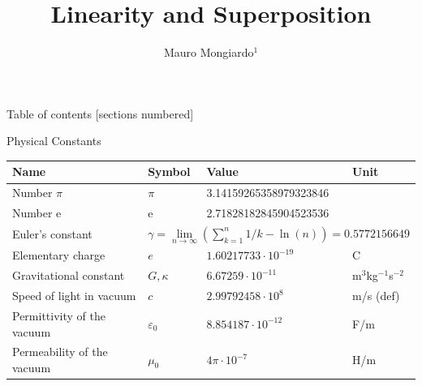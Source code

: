 \documentclass[10pt]{beamer}
\title{Linearity and Superposition}
\date{}
\author{ Mauro Mongiardo$^1$}
\institute{ $^1$ Department of Engineering, University of Perugia, Perugia, Italy.
}
\begin{document}
\maketitle

\begin{frame}{Table of contents}
  [sections numbered]
  \tableofcontents[hideallsubsections]
\end{frame}


\begin{frame}[shrink=40]{Physical Constants}


\begin{center}
\begin{tabular}{||l|lll||} 
\hline
{\bf Name}&{\bf Symbol}&{\bf Value}&{\bf Unit}\\
\hline
\hline
Number $\pi$                 &$\pi$&3.14159265358979323846&\\
Number e                     &e    &2.71828182845904523536&\\
Euler's constant &\multicolumn{3}{|l||}{$\gamma=\lim\limits_{n\rightarrow\infty}\left(\sum\limits_{k=1}^n 1/k-\ln(n)\right)=0.5772156649$}\\
\hline
Elementary charge            &$e$&$1.60217733\cdot10^{-19}$&C\rule{0pt}{13pt}\\
Gravitational constant       &$G,\kappa$&$6.67259\cdot10^{-11}$&m$^3$kg$^{-1}$s$^{-2}$\\
Speed of light in vacuum     &$c$&$2.99792458\cdot10^8$&m/s (def)\\
Permittivity of the vacuum   &$\varepsilon_0$&$8.854187\cdot10^{-12}$&F/m\\
Permeability of the vacuum   &$\mu_0$&$4\pi\cdot10^{-7}$&H/m\\
\hline

\end{tabular}
\end{center}
\end{frame}
\end{document}
